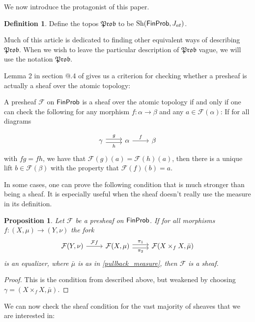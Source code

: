 \documentclass[a4paper]{amsproc}
\makeatletter
\theoremstyle{plain}
\newtheorem{proposition}[theorem]{Proposition}
\theoremstyle{definition}
\newtheorem{definition}[theorem]{Definition}
\theoremstyle{remark}
\numberwithin{equation}{section}
\DeclareMathOperator{\Sh}{Sh}
\newcommand{\FinProb}{\textup{\textsf{FinProb}}}
\newcommand{\Prob}{\mathfrak{Prob}}
\newcommand{\Rmnum}[1]{\expandafter\@slowromancap\romannumeral #1@}
\makeatother
\begin{document}
We now introduce the protagonist of this paper.

\begin{definition}
    Define the topos $\Prob$ to be $\Sh(\FinProb, J_{at})$.
\end{definition}

Much of this article is dedicated to finding other equivalent ways of describing $\Prob$. When we wish to leave the particular description of $\Prob$ vague, we will use the notation $\Prob$.

Lemma 2 in section \Rmnum{3}.4 of \cite{maclane2012sheaves} gives us a criterion for checking whether a presheaf is actually a sheaf over the atomic topology:

A presheaf $\mathcal{F}$ on $\FinProb$ is a sheaf over the atomic topology if and only if one can check the following for any morphism $f: \alpha \to \beta$ and any $a \in \mathcal{F}(\alpha)$: If for all diagrams

\[
\begin{tikzcd}
\gamma \arrow[r, "g", shift left] \arrow[r, "h"', shift right] & \alpha \arrow[r, "f"] & \beta
\end{tikzcd}
\]
with $f g = f h$, we have that $\mathcal{F}(g)(a) = \mathcal{F}(h)(a)$, then there is a unique lift $b \in \mathcal{F}(\beta)$ with the property that $\mathcal{F}(f)(b) = a$.

In some cases, one can prove the following condition that is much stronger than being a sheaf. It is especially useful when the sheaf doesn't really use the measure in its definition.

\begin{proposition} \label{sheaf_condition_weak}
Let $\mathcal{F}$ be a presheaf on $\FinProb$. If for all morphisms $f: (X,\mu) \to (Y,\nu)$ the fork
\[
\begin{tikzcd} \mathcal{F} (Y,\nu) \arrow[r, "\mathcal{F}f"] & \mathcal{F} (X,\mu) \arrow[r, "\pi_1", shift left] \arrow[r, "\pi_2"', shift right] & \mathcal{F} (X \times_f X,\bar{\mu})
\end{tikzcd}
\]
is an equalizer, where $\bar{\mu}$ is as in \ref{pullback_measure}, then $\mathcal{F}$ is a sheaf.
\end{proposition}
\begin{proof}
This is the condition from \cite{maclane2012sheaves} described above, but weakened by choosing $\gamma = (X \times_f X,\bar{\mu})$.
\end{proof}


We can now check the sheaf condition for the vast majority of sheaves that we are interested in:
\end{document}
